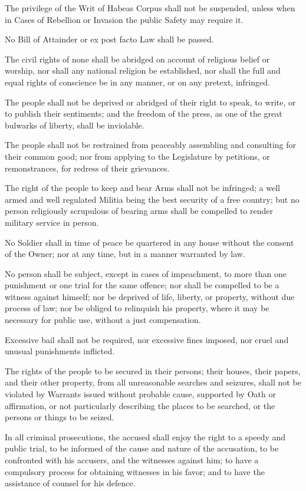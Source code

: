 \documentclass{constitution}
\begin{document}
The privilege of the Writ of Habeas Corpus shall not be suspended,
unless when in Cases of Rebellion or Invasion the public Safety may require it.

No Bill of Attainder or ex post facto Law shall be passed.

The civil rights of none shall be abridged
on account of religious belief or worship,
nor shall any national religion be established,
nor shall the full and equal rights of conscience be in any manner,
or on any pretext, infringed.

The people shall not be deprived or abridged of their right
to speak, to write, or to publish their sentiments;
and the freedom of the press,
as one of the great bulwarks of liberty,
shall be inviolable.

The people shall not be restrained
from peaceably assembling and consulting for their common good;
nor from applying to the Legislature
	by petitions, or remonstrances,
for redress of their grievances.

The right of the people to keep and bear Arms shall not be infringed;
a well armed and well regulated Militia being the best security of a free country;
but no person religiously scrupulous of bearing arms
shall be compelled to render military service in person.

No Soldier shall in time of peace be quartered in any house
without the consent of the Owner;
nor at any time, but in a manner warranted by law.

No person shall be subject,
except in cases of impeachment,
to more than one punishment or one trial for the same offence;
nor shall be compelled to be a witness against himself;
nor be deprived of life, liberty, or property, without due process of law;
nor be obliged to relinquish his property,
where it may be necessary for public use,
without a just compensation.

Excessive bail shall not be required,
nor excessive fines imposed,
nor cruel and unusual punishments inflicted.

The rights of the people to be secured in their persons;
their houses, their papers, and their other property,
from all unreasonable searches and seizures,
shall not be violated by Warrants issued without probable cause,
supported by Oath or affirmation,
or not particularly describing the places to be searched,
or the persons or things to be seized.

In all criminal prosecutions,
the accused shall enjoy the right to a speedy and public trial,
to be informed of the cause and nature of the accusation,
to be confronted with his accusers, and the witnesses against him;
to have a compulsory process for obtaining witnesses in his favor;
and to have the assistance of counsel for his defence.
\end{document}
